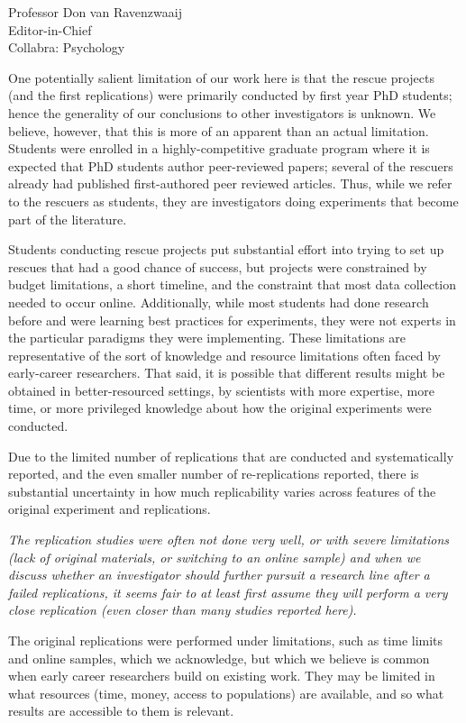 \documentclass{stanfordletter}
\newcommand{\theysaid}[1]{\begin{leftbar} \noindent 
		\textsl{ #1}\end{leftbar}}
\begin{document}
\begin{letter}{Professor Don van Ravenzwaaij \\ Editor-in-Chief \\ Collabra: Psychology }
{			One potentially salient limitation of our work here is that the rescue projects (and the first replications) were primarily conducted by first year PhD students; hence the generality of our conclusions to other investigators is unknown. We believe, however, that this is more of an apparent than an actual limitation. Students were enrolled in a highly-competitive graduate program where it is expected that PhD students author peer-reviewed papers; several of the rescuers already had published first-authored peer reviewed articles. Thus, while we refer to the rescuers as students, they are investigators doing experiments that become part of the literature.
			\newline 
			
			Students conducting rescue projects put substantial effort into trying to set up rescues that had a good chance of success, but projects were constrained by budget limitations, a short timeline, and the constraint that most data collection needed to occur online. Additionally, while most students had done research before and were learning best practices for experiments, they were not experts in the particular paradigms they were implementing. These limitations are representative of the sort of knowledge and resource limitations often faced by early-career researchers. That said, it is possible that different results might be obtained in better-resourced settings, by scientists with more expertise, more time, or more privileged knowledge about how the original experiments were conducted.
			\newline 
			
			Due to the limited number of replications that are conducted and systematically reported, and the even smaller number of re-replications reported, there is substantial uncertainty in how much replicability varies across features of the original experiment and replications.}
		
		\theysaid{The replication studies were often not done very well, or with severe limitations (lack of original materials, or switching to an online sample) and when we discuss whether an investigator should further pursuit a research line after a failed replications, it seems fair to at least first assume they will perform a very close replication (even closer than many studies reported here).}
		
		The original replications were performed under limitations, such as time limits and online samples, which we acknowledge, but which we believe is common when early career researchers build on existing work. They may be limited in what resources (time, money, access to populations) are available, and so what results are accessible to them is relevant. 
		

\end{letter}
\end{document}
